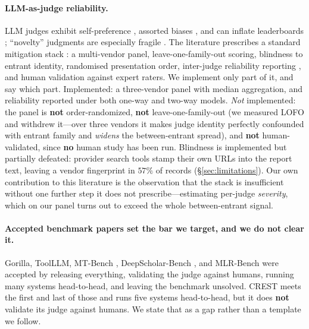 \paragraph{LLM-as-judge reliability.} LLM judges exhibit self-preference
\citep{panickssery2024own}, assorted biases \citep{ye2024justice}, and can inflate leaderboards
\citep{singh2025leaderboard}; ``novelty'' judgments are especially fragile
\citep{sinhahajari2026mirage}. The literature prescribes a standard mitigation stack
\citep{zheng2023mtbench}: a multi-vendor panel, leave-one-family-out scoring, blindness to entrant
identity, randomised presentation order, inter-judge reliability reporting
\citep{hayes2007alpha,koo2016icc}, and human validation against expert raters. We implement only part of it, and say which part. Implemented: a three-vendor panel
with median aggregation, and reliability reported under both one-way and two-way models. \emph{Not}
implemented: the panel is \textbf{not} order-randomized, \textbf{not} leave-one-family-out (we
measured LOFO and withdrew it---over three vendors it makes judge identity perfectly confounded with
entrant family and \emph{widens} the between-entrant spread), and \textbf{not} human-validated, since
\textbf{no} human study has been run. Blindness is implemented but partially defeated: provider
search tools stamp their own URLs into the report text, leaving a vendor fingerprint in $57\%$ of
records (\S\ref{sec:limitations}). Our own contribution to this literature is the observation that
the stack is insufficient without one further step it does not prescribe---estimating per-judge
\emph{severity}, which on our panel turns out to exceed the whole between-entrant signal.

\paragraph{Accepted benchmark papers set the bar we target, and we do not clear it.} Gorilla,
ToolLLM, MT-Bench \citep{zheng2023mtbench}, DeepScholar-Bench \citep{deepscholarbench2025}, and
MLR-Bench \citep{chen2025mlrbench} were accepted by releasing everything, validating the judge
against humans, running many systems head-to-head, and leaving the benchmark unsolved. CREST meets
the first and last of those and runs five systems head-to-head, but it does \textbf{not} validate its
judge against humans. We state that as a gap rather than a template we follow.
